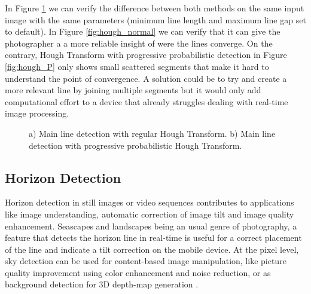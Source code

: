 In Figure \ref{fig:hough_methods} we can verify the difference between both methods on the same input image with the same parameters (minimum line length and maximum line gap set to default). In Figure \ref{fig:hough_normal} we can verify that it can give the photographer a a more reliable insight of were the lines converge. On the contrary, Hough Transform with progressive probabilistic detection in Figure \ref{fig:hough_P} only shows small scattered segments that make it hard to understand the point of convergence. A solution could be to try and create a more relevant line by joining multiple segments but it would only add computational effort to a device that already struggles dealing with real-time image processing.

\begin{figure}[htbp]
	\centering
  	\caption{a) Main line detection with regular Hough Transform. b) Main line detection with progressive probabilistic Hough Transform.}
    \label{fig:hough_methods}
\end{figure}

\subsection{Horizon Detection}
\label{sub:horizon_detection}

Horizon detection in still images or video sequences contributes to applications like image understanding, automatic correction of image tilt and image quality enhancement. Seascapes and landscapes being an usual genre of photography, a feature that detects the horizon line in real-time is useful for a correct placement of the line and indicate a tilt correction on the mobile device. At the pixel level, sky detection can be used for content-based image manipulation, like picture quality improvement using color enhancement and noise reduction, or as background detection for 3D depth-map generation \cite{zafarifar2006blue}.

